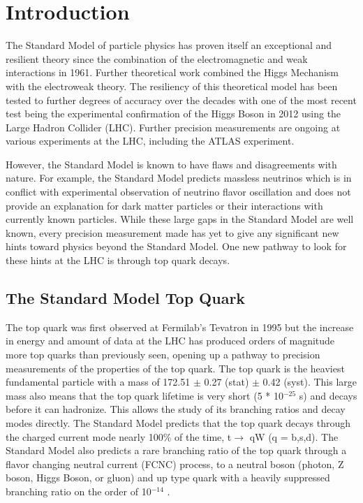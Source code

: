 
\chapter{Introduction}
\label{ch:Introduction}

The Standard Model of particle physics has proven itself an exceptional and resilient theory since the combination of the electromagnetic and weak interactions in 1961\cite{SM1Glashow}.  Further theoretical work combined the Higgs Mechanism\cite{Higgs1,Higgs2} with the electroweak theory\cite{SM2Weinberg, SM3Salam}.  The resiliency of this theoretical model has been tested to further degrees of accuracy over the decades with one of the most recent test being the experimental confirmation of the Higgs Boson in 2012\cite{Higgs3,Higgs4} using the Large Hadron Collider (LHC).  Further precision measurements are ongoing at various experiments at the LHC, including the ATLAS experiment.

However, the Standard Model is known to have flaws and disagreements with nature.  For example, the Standard Model predicts massless neutrinos which is in conflict with experimental observation of neutrino flavor oscillation and does not provide an explanation for dark matter particles or their interactions with currently known particles.  While these large gaps in the Standard Model are well known, every precision measurement made has yet to give any significant new hints toward physics beyond the Standard Model.  One new pathway to look for these hints at the LHC is through top quark decays.

\section{The Standard Model Top Quark}
The top quark was first observed at Fermilab's Tevatron in 1995\cite{TopObs} but the increase in energy and amount of data at the LHC has produced orders of magnitude more top quarks than previously seen, opening up a pathway to precision measurements of the properties of the top quark.  The top quark is the heaviest fundamental particle with a mass of 172.51 $\pm$ 0.27 (stat) $\pm$ 0.42 (syst)\cite{TopMass2017}.  This large mass also means that the top quark lifetime is very short (5 * 10$^{-25}$ s) and decays before it can hadronize.  This allows the study of its branching ratios and decay modes directly.  The Standard Model predicts that the top quark decays through the charged current mode nearly 100\% of the time, t$\rightarrow$ qW (q = b,s,d)\cite{PDG2018}.   The Standard Model also predicts a rare branching ratio of the top quark through a flavor changing neutral current (FCNC) process, to a neutral boson (photon, Z boson, Higgs Boson, or gluon) and up type quark with a heavily suppressed branching ratio on the order of 10$^{-14}$ \cite{2HDM-2}.

